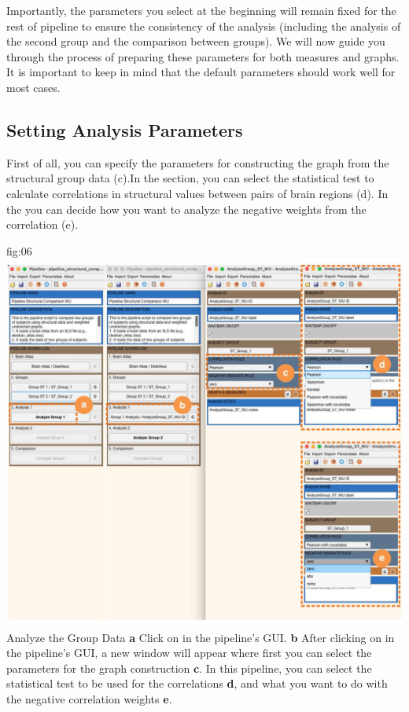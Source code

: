 \documentclass[justified]{tufte-handout}
\begin{document}
Importantly, the parameters you select at the beginning will remain fixed for the rest of pipeline to ensure the consistency of the analysis (including the analysis of the second group and the comparison between groups). We will now guide you through the process of preparing these parameters for both measures and graphs. It is important to keep in mind that the default parameters should work well for most cases.

\subsection{Setting Analysis Parameters}


First of all, you can specify the parameters for constructing the graph from the structural group data (c).In the  section, you can select the statistical test to calculate correlations in structural values between pairs of brain regions (d).
In the  you can decide how you want to analyze the negative weights from the correlation (e). 

	{fig:06}
	{\includegraphics{fig06.jpg}}
	{Analyze the Group Data}
	{
	{\bf a} Click on  in the pipeline's GUI.
    {\bf b} After clicking on  in the pipeline's GUI, a new window will appear where first you can select the parameters for the graph construction {\bf c}. In this pipeline, you can select the statistical test to be used for the correlations {\bf d}, and what you want to do with the negative correlation weights {\bf e}.
	}
\end{document}
